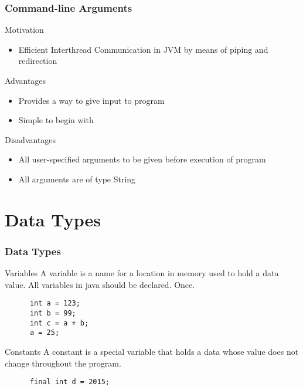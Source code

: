 \documentclass[10pt, compress]{beamer}
\begin{document}
\begin{frame}[fragile]
  \frametitle{Command-line Arguments}
  \begin{block}{Motivation}
    \begin{itemize}
      \item[] Efficient Interthread Communication in JVM by means of piping and redirection
    \end{itemize}
  \end{block}
  \begin{block}{Advantages}
    \begin{itemize}
      \item[] Provides a way to give input to program
      \item[] Simple to begin with
    \end{itemize}
  \end{block}
  \begin{block}{Disadvantages}
    \begin{itemize}
      \item[] All user-specified arguments to be given before execution of program
      \item[] All arguments are of type String
    \end{itemize}
  \end{block}
\end{frame}

\section{Data Types}

\begin{frame}[fragile]
  \frametitle{Data Types}
  \begin{block}{Variables}
    A variable is a name for a location in memory used to hold a data value. All variables in java should be declared. Once.
    \begin{verbatim}
      int a = 123;
      int b = 99;
      int c = a + b;
      a = 25;
    \end{verbatim}
  \end{block}
  \begin{block}{Constants}
    A constant is a special variable that holds a data whose value does not change throughout the program.
    \begin{verbatim}
      final int d = 2015;
    \end{verbatim}
  \end{block}
\end{frame}
\end{document}
